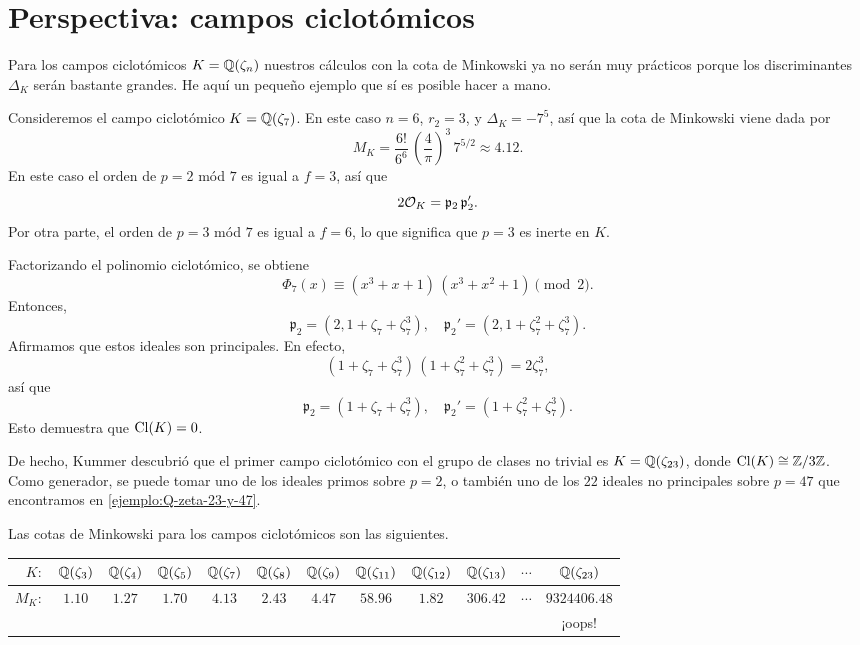 
\section{Perspectiva: campos ciclotómicos}

Para los campos ciclotómicos $K = \mathbb{Q} (\zeta_n)$ nuestros cálculos con la cota
de Minkowski ya no serán muy prácticos porque los discriminantes $\Delta_K$
serán bastante grandes. He aquí un pequeño ejemplo que sí es posible hacer
a mano.

\begin{ejemplo}
  Consideremos el campo ciclotómico $K = \mathbb{Q} (\zeta_7)$. En este caso
  $n = 6$, $r_2 = 3$, y $\Delta_K = -7^5$, así que la cota de Minkowski
  viene dada por
  $$M_K = \frac{6!}{6^6} \, \left(\frac{4}{\pi}\right)^3 \, 7^{5/2} \approx 4.12.$$
  En este caso el orden de $p = 2$ mód $7$ es igual a $f = 3$, así que
  $$2\mathcal{O}_K = \mathfrak{p}_2 \, \mathfrak{p}_2'.$$
  Por otra parte, el orden de $p = 3$ mód $7$ es igual a $f = 6$, lo que
  significa que $p = 3$ es inerte en $K$.

  Factorizando el polinomio ciclotómico, se obtiene
  $$\Phi_7 (x) \equiv (x^3 + x + 1)\,(x^3 + x^2 + 1) \pmod{2}.$$
  Entonces,
  \[ \mathfrak{p}_2 = (2, 1 + \zeta_7 + \zeta_7^3), \quad
     \mathfrak{p}_2' = (2, 1 + \zeta_7^2 + \zeta_7^3). \]
  Afirmamos que estos ideales son principales. En efecto,
  $$(1 + \zeta_7 + \zeta_7^3)\,(1 + \zeta_7^2 + \zeta_7^3) = 2\zeta_7^3,$$
  así que
  \[ \mathfrak{p}_2 = (1 + \zeta_7 + \zeta_7^3), \quad
     \mathfrak{p}_2' = (1 + \zeta_7^2 + \zeta_7^3). \]
  Esto demuestra que $\operatorname{Cl} (K) = 0$.
\end{ejemplo}

De hecho, Kummer descubrió que el primer campo ciclotómico con el grupo de
clases no trivial es $K = \mathbb{Q} (\zeta_{23})$, donde $\operatorname{Cl} (K) \cong \mathbb{Z}/3\mathbb{Z}$.
Como generador, se puede tomar uno de los ideales primos sobre $p = 2$,
o también uno de los $22$ ideales no principales sobre $p = 47$ que encontramos
en \ref{ejemplo:Q-zeta-23-y-47}.

Las cotas de Minkowski para los campos ciclotómicos son las siguientes.

\begin{center}\renewcommand{\arraystretch}{1.5}
  \begin{tabular}{rccccccccccc}
    \hline
    $K\colon$ & $\mathbb{Q} (\zeta_3)$ & $\mathbb{Q} (\zeta_4)$ & $\mathbb{Q} (\zeta_5)$ & $\mathbb{Q} (\zeta_7)$ & $\mathbb{Q} (\zeta_8)$ & $\mathbb{Q} (\zeta_9)$ & $\mathbb{Q} (\zeta_{11})$ & $\mathbb{Q} (\zeta_{12})$ & $\mathbb{Q} (\zeta_{13})$ & $\cdots$ & $\mathbb{Q} (\zeta_{23})$ \tabularnewline
    \hline
    $M_K\colon$ & $1.10$ & $1.27$ & $1.70$ & $4.13$ & $2.43$ & $4.47$ & $58.96$ & $1.82$ & $306.42$ & $\cdots$ & $9324406.48$ \tabularnewline
    \hline
    & & & & & & & & & & & ¡oops! \tabularnewline
  \end{tabular}
\end{center}

